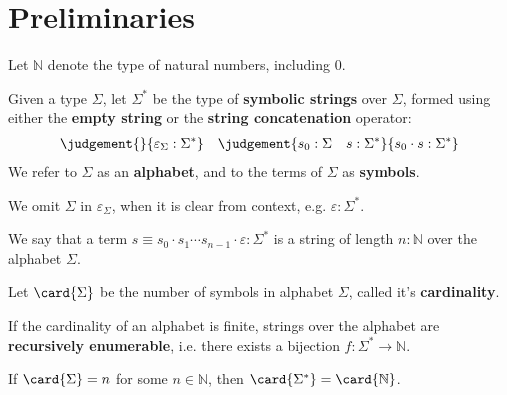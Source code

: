 
\section{Preliminaries}

\begin{definition} Let $\mathbb{N}$ denote the type of natural numbers,
including $0$. \end{definition}

\begin{definition} Given a type $\Sigma$, let $\Sigma^*$ be the type of
\textbf{symbolic strings} over $\Sigma$, formed using either the \textbf{empty
string} or the \textbf{string concatenation} operator:
\begin{align*}\label{def:empty-string}
\judgement{}{\varepsilon_\Sigma:\Sigma^*}
\quad
\judgement{s_0:\Sigma \quad s:\Sigma^*}{s_0 \cdot s:\Sigma^*}
\end{align*}
We refer to $\Sigma$ as an \textbf{alphabet}, and to the terms of $\Sigma$ as
\textbf{symbols}. \end{definition}

We omit $\Sigma$ in $\varepsilon_\Sigma$, when it is clear from context, e.g.
$\varepsilon:\Sigma^*$.

\begin{definition} We say that a term $s\equiv s_0 \cdot s_1 \cdots s_{n-1}
\cdot \varepsilon : \Sigma^*$  is a string of length $n:\mathbb{N}$ over the
alphabet $\Sigma$.\end{definition}

\begin{definition} Let $\card{\Sigma}$ be the number of symbols in alphabet
$\Sigma$, called it's \textbf{cardinality}. \end{definition}

If the cardinality of an alphabet is finite, strings over the alphabet are
\textbf{recursively enumerable}, i.e. there exists a bijection
$f:\Sigma^*\rightarrow\mathbb{N}$.

\begin{theorem} If $\card{\Sigma} = n$ for some $n\in\mathbb{N}$, then
$\card{\Sigma^*}=\card{\mathbb{N}}$.\end{theorem}

